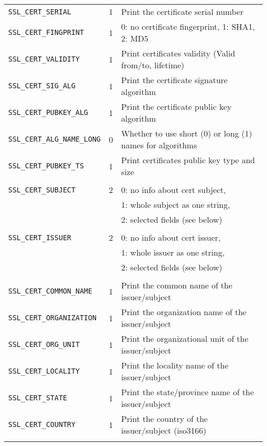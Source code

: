 \documentclass[documentation]{subfiles}
\begin{document}
\begin{longtable}{lcl}
    {\tt SSL\_CERT\_SERIAL}          & 1 & Print the certificate serial number\\
    {\tt SSL\_CERT\_FINGPRINT}       & 1 & 0: no certificate fingerprint, 1: SHA1, 2: MD5\\
    {\tt SSL\_CERT\_VALIDITY}        & 1 & Print certificates validity (Valid from/to, lifetime)\\
    {\tt SSL\_CERT\_SIG\_ALG}        & 1 & Print the certificate signature algorithm\\
    {\tt SSL\_CERT\_PUBKEY\_ALG}     & 1 & Print the certificate public key algorithm\\
    {\tt SSL\_CERT\_ALG\_NAME\_LONG} & 0 & Whether to use short (0) or long (1) names for algorithms\\
    {\tt SSL\_CERT\_PUBKEY\_TS}      & 1 & Print certificates public key type and size\\\\

    {\tt SSL\_CERT\_SUBJECT} & 2 & 0: no info about cert subject,\\
                             &   & 1: whole subject as one string,\\
                             &   & 2: selected fields (see below)\\\\

    {\tt SSL\_CERT\_ISSUER}  & 2 & 0: no info about cert issuer,\\
                             &   & 1: whole issuer as one string,\\
                             &   & 2: selected fields (see below)\\\\

    {\tt SSL\_CERT\_COMMON\_NAME} & 1 & Print the common name of the issuer/subject\\
    {\tt SSL\_CERT\_ORGANIZATION} & 1 & Print the organization name of the issuer/subject\\
    {\tt SSL\_CERT\_ORG\_UNIT}    & 1 & Print the organizational unit of the issuer/subject\\
    {\tt SSL\_CERT\_LOCALITY}     & 1 & Print the locality name of the issuer/subject\\
    {\tt SSL\_CERT\_STATE}        & 1 & Print the state/province name of the issuer/subject\\
    {\tt SSL\_CERT\_COUNTRY}      & 1 & Print the country of the issuer/subject (iso3166)\\\\


\end{longtable}
\end{document}
